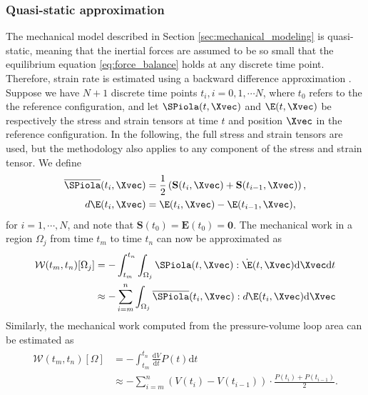 \subsubsection{Quasi-static approximation}
The mechanical model described in Section
\ref{sec:mechanical_modeling} is quasi-static, meaning that the
inertial forces are assumed to be so small that the
equilibrium equation \eqref{eq:force_balance} holds at any discrete
time point. Therefore, strain rate is estimated using a
backward difference approximation \cite{wang2011myocardial}.
Suppose we have $N+1$ discrete time points $t_i, i = 0,1, \cdots N$, where $ t_0$
refers to the the reference configuration, and let $\SPiola(t, \Xvec)$
and $\E(t, \Xvec)$ be respectively the stress and strain tensors at
time $t$ and position $\Xvec$ in the reference configuration. In the
following, the full stress and strain tensors are used, but the methodology
also applies to any component of the stress and strain tensor. We define
\begin{align}
  \overline{\SPiola}(t_i,\Xvec) &= \frac{1}{2}\left( \mathbf{S}(t_i,\Xvec) + \mathbf{S}(t_{i-1},\Xvec) \right),\\
  d\E(t_i,\Xvec) &= \E(t_i,\Xvec) - \E(t_{i-1},\Xvec),
\end{align}
for $i = 1,\cdots, N$, and note that $ \mathbf{S}(t_0) = \mathbf{E}(t_0) = \mathbf{0}$.
The mechanical work in a region $\Omega_j$ from time $t_m$ to time $t_n$ can now be approximated
as 
\begin{align}
  \begin{split}
   \mathcal{W}(t_m, t_n)[\Omega_j]
  &= -\int_{t_m}^{t_n} \int_{\Omega_j}\SPiola(t, \Xvec) : \dot{\E}(t, \Xvec) \mathrm{d}\Xvec \mathrm{d}t \\
  &\approx - \sum_{i = m}^{n}\int_{\Omega_j}\overline{\SPiola}(t_i, \Xvec) : d\E(t_i, \Xvec) \mathrm{d}\Xvec
  \end{split}
\label{eq:total_work}
\end{align}
Similarly, the mechanical work computed from the pressure-volume loop area can be estimated as  
\begin{align}
  \begin{split}
  \mathcal{W}(t_m,t_n)[\Omega]
  &= - \int_{t_m}^{t_n} \frac{\mathrm{d}V}{\mathrm{d}t} P(t) \mathrm{d}t \\
  &\approx -\sum_{i= m}^{n}  (V(t_i) - V(t_{i-1})) \cdot \frac{P(t_i) + P(t_{i-1})}{2}.
  \end{split}
\end{align}

